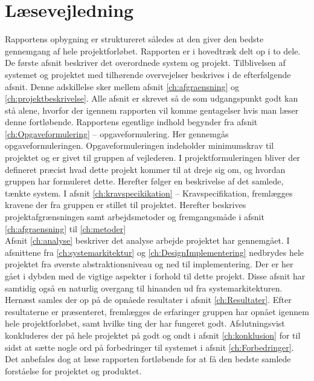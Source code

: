 \section{Læsevejledning}
Rapportens opbygning er struktureret således at den giver den bedste gennemgang af hele projektforløbet. Rapporten er i hovedtræk delt op i to dele. De første afsnit beskriver det overordnede system og projekt. Tilblivelsen af systemet og projektet med tilhørende overvejelser beskrives i de efterfølgende afsnit. Denne adskillelse sker mellem afsnit \ref{ch:afgraensning} og \ref{ch:projektbeskrivelse}. Alle afsnit er skrevet så de som udgangspunkt godt kan stå alene, hvorfor der igennem rapporten vil komme gentagelser hvis man læser denne fortløbende. Rapportens egentlige indhold begynder fra afsnit \ref{ch:Opgaveformulering} – opgaveformulering.  Her gennemgås opgaveformuleringen. Opgaveformuleringen indeholder minimumskrav til projektet og er givet til gruppen af vejlederen. I projektformuleringen bliver der defineret præcist hvad dette projekt kommer til at dreje sig om, og hvordan gruppen har formuleret dette. Herefter følger en beskrivelse af det samlede, tænkte system.
I afsnit \ref{ch:kravspecikikation} – Kravspecifikation, fremlægges kravene der fra gruppen er stillet til projektet. Herefter beskrives projektafgrænsningen samt arbejdsmetoder og fremgangsmåde i afsnit \ref{ch:afgraensning} til \ref{ch:metoder}\\
Afsnit \ref{ch:analyse} beskriver det analyse arbejde projektet har gennemgået. I afsnittene fra \ref{ch:systemarkitektur} og \ref{ch:DesignImplementering} nedbrydes hele projektet fra øverste abstraktionsniveau og ned til implementering. Der er her gået i dybden med de vigtige aspekter i forhold til dette projekt. Disse afsnit har samtidig også en naturlig overgang til hinanden ud fra systemarkitekturen. \\
Hernæst samles der op på de opnåede resultater i afsnit \ref{ch:Resultater}. Efter resultaterne er præsenteret, fremlægges de erfaringer gruppen har opnået igennem hele projektforløbet, samt hvilke ting der har fungeret godt. Afslutningsvist konkluderes der på hele projektet på godt og ondt i afsnit \ref{ch:konklusion} for til sidst at sætte nogle ord på forbedringer til systemet i afsnit \ref{ch:Forbedringer}. Det anbefales dog at læse rapporten fortløbende for at få den bedste samlede forståelse for projektet og produktet.